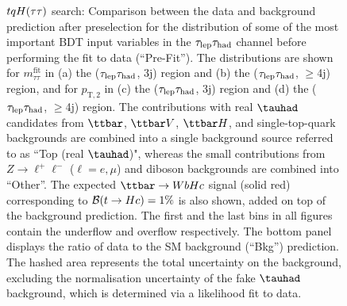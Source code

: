 \begin{figure}[t]
\begin{center}
\caption{$tqH(\tau\tau)$ search: Comparison between the data and background prediction after preselection for the distribution of some of the most
important BDT input variables in the $\tau_{\mathrm{lep}} \tau_{\mathrm{had}}$ channel before performing the fit to data (``Pre-Fit''). The distributions are shown for
$m_{\tau\tau}^{\text{fit}}$ in (a) the ($\tau_{\mathrm{lep}} \tau_{\mathrm{had}}$, 3j) region and (b) the ($\tau_{\mathrm{lep}} \tau_{\mathrm{had}}$, $\geq$4j) region, and for
$p_{\text{T},2}$ in (c) the ($\tau_{\mathrm{lep}} \tau_{\mathrm{had}}$, 3j)  region and (d) the ($\tau_{\mathrm{lep}} \tau_{\mathrm{had}}$, $\geq$4j) region.
The contributions with real $\tauhad$ candidates from $\ttbar$,  $\ttbar V$, $\ttbar H$, and single-top-quark backgrounds are combined into
a single background source referred to as ``Top (real $\tauhad$)", whereas the small contributions from 
$Z\to \ell^+\ell^-$ ($\ell = e, \mu$) and diboson backgrounds are combined into ``Other''. 
The expected $\Hc$ signal (solid red) corresponding to $\mathcal{B}(t\to Hc)=1\%$ is also shown,
added on top of the background prediction.
The first and the last bins in all figures contain the underflow and overflow respectively.
The bottom panel displays the ratio of data to the SM background (``Bkg'') prediction.
The hashed area represents the total uncertainty on the background, excluding the normalisation uncertainty of the fake $\tauhad$ background, 
which is determined via a likelihood fit to data.}
\label{fig:BDT_inputs_lephad}
\end{center}
\end{figure}

